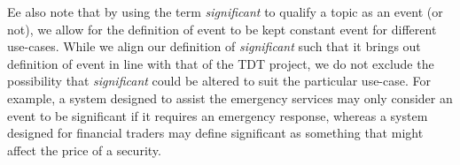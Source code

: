 Ee also note that by using the term \emph{significant} to qualify a topic as an event (or not), we allow for the definition of event to be kept constant event for different use-cases.
While we align our definition of \emph{significant} such that it brings out definition of event in line with that of the TDT project, we do not exclude the possibility that \emph{significant} could be altered to suit the particular use-case.
For example, a system designed to assist the emergency services may only consider an event to be significant if it requires an emergency response, whereas a system designed for financial traders may define significant as something that might affect the price of a security.